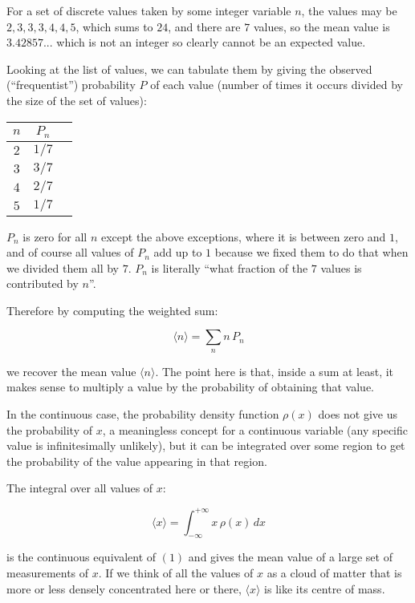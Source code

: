For a set of discrete values taken by some integer variable $n$, the values may be $2, 3, 3, 3, 4, 4, 5$, which sums to $24$, and there are $7$ values, so the mean value is $3.42857...$ which is not an integer so clearly cannot be an expected value.

Looking at the list of values, we can tabulate them by giving the observed (``frequentist'') probability $P$ of each value (number of times it occurs divided by the size of the set of values):

\begin{center}
    \begin{tabular}{ c|c|c }
        $n$ & $P_n$ \\
        \hline
        $2$ & $1/7$  \\
        $3$ & $3/7$  \\
        $4$ & $2/7$  \\
        $5$ & $1/7$
    \end{tabular}
\end{center}

$P_n$ is zero for all $n$ except the above exceptions, where it is between zero and $1$, and of course all values of $P_n$ add up to $1$ because we fixed them to do that when we divided them all by $7$. $P_n$ is literally ``what fraction of the $7$ values is contributed by $n$''.

Therefore by computing the weighted sum:

$$ \langle {n} \rangle = \sum_n{n\,P_n} $$

we recover the mean value $\langle{n}\rangle$. The point here is that, inside a sum at least, it makes sense to multiply a value by the probability of obtaining that value.

In the continuous case, the probability density function $\rho(x)$ does not give us the probability of $x$, a meaningless concept for a continuous variable (any specific value is infinitesimally unlikely), but it can be integrated over some region to get the probability of the value appearing in that region.

The integral over all values of $x$:

$$
\langle x \rangle =
\int_{-\infty}^{+\infty}
x\,\rho(x)
\,dx
$$

is the continuous equivalent of $(1)$ and gives the mean value of a large set of measurements of $x$. If we think of all the values of $x$ as a cloud of matter that is more or less densely concentrated here or there, $\langle x \rangle$ is like its centre of mass.

